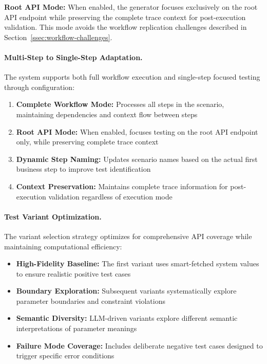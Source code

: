 \documentclass[conference]{IEEEtran}
\begin{document}
\textbf{Root API Mode:} When enabled, the generator focuses exclusively on the root API endpoint while preserving the complete trace context for post-execution validation. This mode avoids the workflow replication challenges described in Section~\ref{ssec:workflow-challenges}.

\paragraph{Multi-Step to Single-Step Adaptation.}
The system supports both full workflow execution and single-step focused testing through configuration:

\begin{enumerate}[leftmargin=*]
  \item \textbf{Complete Workflow Mode:} Processes all steps in the scenario,
        maintaining dependencies and context flow between steps
  \item \textbf{Root API Mode:} When enabled, focuses testing on the
        root API endpoint only, while preserving complete trace context
  \item \textbf{Dynamic Step Naming:} Updates scenario names based on the actual
        first business step to improve test identification
  \item \textbf{Context Preservation:} Maintains complete trace information
        for post-execution validation regardless of execution mode
\end{enumerate}

\paragraph{Test Variant Optimization.}
The variant selection strategy optimizes for comprehensive API coverage while maintaining computational efficiency:

\begin{itemize}[leftmargin=*]
  \item \textbf{High-Fidelity Baseline:} The first variant uses smart-fetched
        system values to ensure realistic positive test cases
  \item \textbf{Boundary Exploration:} Subsequent variants systematically
        explore parameter boundaries and constraint violations
  \item \textbf{Semantic Diversity:} LLM-driven variants explore different
        semantic interpretations of parameter meanings
  \item \textbf{Failure Mode Coverage:} Includes deliberate negative test
        cases designed to trigger specific error conditions
\end{itemize}
\end{document}

